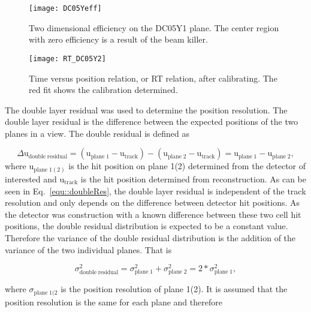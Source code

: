 \begin{figure}[h!t]
  \centering \texttt{[image: DC05Yeff]}
  \caption{}{Two dimensional efficiency on the DC05Y1 plane.  The center region
    with zero efficiency is a result of the beam killer.}
  \label{fig::DC05Yeff}%
\end{figure}

\begin{figure}[h!t]
  \centering \texttt{[image: RT\_DC05Y2]}
  \caption{}{Time versus position relation, or RT relation, after calibrating.
    The red fit shows the calibration determined.}
  \label{fig:RT_DC05Y2}%
\end{figure}

The double layer residual was used to determine the position resolution.  The
double layer residual is the difference between the expected positions of the
two planes in a view.  The double residual is defined as

\begin{equation}
  \label{equ::doubleRes}
  \Delta \mathrm{u}_{\mathrm{double \; residual}} = (\mathrm{u}_{\mathrm{plane
      \; 1}} - \mathrm{u}_{\mathrm{track}}) - (\mathrm{u}_{\mathrm{plane \; 2}}
  - \mathrm{u}_{\mathrm{track}}) = \mathrm{u}_{\mathrm{plane \; 1}} -
  \mathrm{u}_{\mathrm{plane \; 2}},
\end{equation}
\noindent
where u$_{\mathrm{plane \; 1(2)}}$ is the hit position on plane 1(2) determined
from the detector of interested and u$_{\mathrm{track}}$ is the hit position
determined from reconstruction.  As can be seen in Eq.~\ref{equ::doubleRes}, the
double layer residual is independent of the track resolution and only depends on
the difference between detector hit positions.  As the detector was construction
with a known difference between these two cell hit positions, the double
residual distribution is expected to be a constant value.  Therefore the
variance of the double residual distribution is the addition of the variance of
the two individual planes.  That is

\begin{equation}
\sigma_{\mathrm{double \; residual}}^2 = \sigma_{\mathrm{plane \; 1}}^2 +
\sigma_{\mathrm{plane \; 2}}^2 = 2*\sigma_{\mathrm{plane \; 1}}^2,
\end{equation}

\noindent
where $\sigma_{\mathrm{plane \; 1(2}}$ is the position resolution of plane 1(2).
It is assumed that the position resolution is the same for each plane and
therefore


